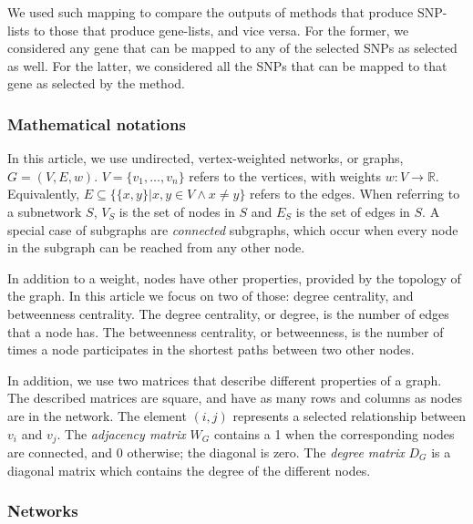 \documentclass[twocolumn, 11pt]{article}
\begin{document}
We used such mapping to compare the outputs of methods that produce SNP-lists to those that produce gene-lists, and vice versa. For the former, we considered any gene that can be mapped to any of the selected SNPs as selected as well. For the latter, we considered all the SNPs that can be mapped to that gene as selected by the method.

\subsubsection{Mathematical notations}
\label{methods:notation}
In this article, we use undirected, vertex-weighted networks, or graphs, $G = (V,E,w)$. $V = \{v_{1}, \dots{}, v_{n}\}$ refers to the vertices, with weights $w: V \rightarrow \mathbb{R}$. Equivalently, $E \subseteq \{\{x,y\} | x,y \in V \wedge x \neq y\}$ refers to the edges. When referring to a subnetwork $S$, $V_{S}$ is the set of nodes in $S$ and $E_{S}$ is the set of edges in $S$. A special case of subgraphs are \emph{connected} subgraphs, which occur when every node in the subgraph can be reached from any other node.

In addition to a weight, nodes have other properties, provided by the topology of the graph. In this article we focus on two of those: degree centrality, and betweenness centrality. The degree centrality, or degree, is the number of edges that a node has. The betweenness centrality, or betweenness, is the number of times a node participates in the shortest paths between two other nodes.

In addition, we use two matrices that describe different properties of a graph. The described matrices are square, and have as many rows and columns as nodes are in the network. The element $(i,j)$ represents a  selected relationship between $v_i$ and $v_j$. The \emph{adjacency matrix} $W_G$ contains a 1 when the corresponding nodes are connected, and 0 otherwise; the diagonal is zero. The \emph{degree matrix} $D_G$ is a diagonal matrix which contains the degree of the different nodes.

\subsubsection{Networks}
\label{methods:networks}
\end{document}
